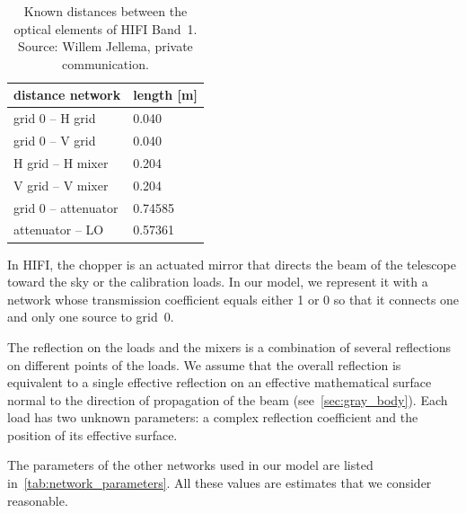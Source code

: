 \begin{refsection}
\begin{table}
    \centering
    \begin{tabular}{ll}
        \toprule
        distance network     & length [\si{\meter}] \\
        \midrule
        grid 0 -- H grid     & \num{0.040}   \\
        grid 0 -- V grid     & \num{0.040}   \\
        H grid -- H mixer    & \num{0.204}   \\
        V grid -- V mixer    & \num{0.204}   \\
        grid 0 -- attenuator & \num{0.74585} \\
        attenuator -- LO     & \num{0.57361} \\
        \bottomrule
    \end{tabular}
    \caption{
        Known distances between the optical elements of HIFI Band~1.
        Source: Willem Jellema, private communication.
    }
    \label{tab:known_distances}
\end{table}

In HIFI, the chopper is an actuated mirror that directs the beam of the telescope toward the sky or the calibration loads.
In our model, we represent it with a network whose transmission coefficient equals either 1 or 0 so that it connects one and only one source to grid~0.

The reflection on the loads and the mixers is a combination of several reflections on different points of the loads.
We assume that the overall reflection is equivalent to a single effective reflection on an effective mathematical surface normal to the direction of propagation of the beam (see~\cref{sec:gray_body}).
Each load has two unknown parameters: a complex reflection coefficient and the position of its effective surface.

The parameters of the other networks used in our model are listed in~\cref{tab:network_parameters}.
All these values are estimates that we consider reasonable.


\end{refsection}
